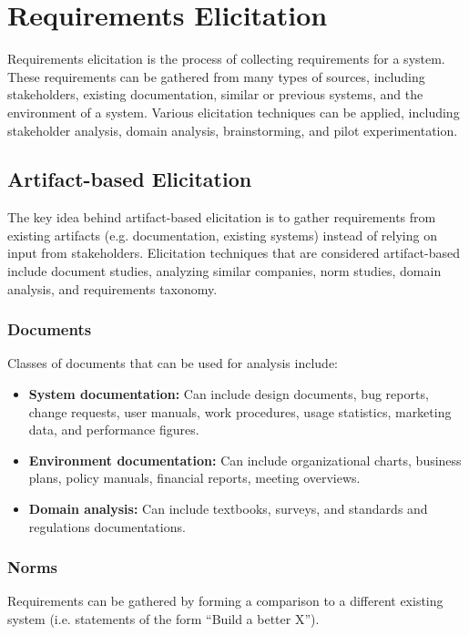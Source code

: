\documentclass[12pt,titlepage]{article}
\begin{document}
  \section{Requirements Elicitation}
    Requirements elicitation is the process of collecting requirements for a system. These requirements can be gathered from many types of sources,
    including stakeholders, existing documentation, similar or previous systems, and the environment of a system. Various elicitation techniques
    can be applied, including stakeholder analysis, domain analysis, brainstorming, and pilot experimentation.

    \subsection{Artifact-based Elicitation}
      The key idea behind artifact-based elicitation is to gather requirements from existing artifacts (e.g. documentation, existing systems)
      instead of relying on input from stakeholders. Elicitation techniques that are considered artifact-based include
      document studies, analyzing similar companies, norm studies, domain analysis, and requirements taxonomy.

      \subsubsection{Documents}
        Classes of documents that can be used for analysis include:
        \begin{itemize}
          \item \textbf{System documentation:} Can include design documents, bug reports, change requests, user manuals, work procedures, usage statistics,
          marketing data, and performance figures.
          \item \textbf{Environment documentation:} Can include organizational charts, business plans, policy manuals, financial reports, meeting overviews.
          \item \textbf{Domain analysis:} Can include textbooks, surveys, and standards and regulations documentations.
        \end{itemize}

      \subsubsection{Norms}
        Requirements can be gathered by forming a comparison to a different existing system (i.e. statements of the form ``Build a better X'').
\end{document}
